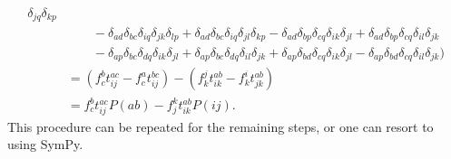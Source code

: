 \documentclass[
    a4paper, aps, twocolumn, floatfix, superscriptaddress,
    nofootinbib]{revtex4-1}
\newcommand{\1}{\mathds{1}}
\begin{document}
\begin{widetext}
\begin{align}
                        \delta_{j q} \delta_{k p}
                        \nonumber \\
                        &\qquad
                        - \delta_{a d} \delta_{b c} \delta_{i q}
                        \delta_{j k} \delta_{l p}
                        + \delta_{a d} \delta_{b c} \delta_{i q}
                        \delta_{j l} \delta_{k p}
                        - \delta_{a d} \delta_{b p} \delta_{c q}
                        \delta_{i k} \delta_{j l}
                        + \delta_{a d} \delta_{b p} \delta_{c q}
                        \delta_{i l} \delta_{j k}
                        \nonumber \\
                        &\qquad
                        - \delta_{a p} \delta_{b c} \delta_{d q}
                        \delta_{i k} \delta_{j l}
                        + \delta_{a p} \delta_{b c} \delta_{d q}
                        \delta_{i l} \delta_{j k}
                        + \delta_{a p} \delta_{b d} \delta_{c q}
                        \delta_{i k} \delta_{j l}
                        - \delta_{a p} \delta_{b d} \delta_{c q}
                        \delta_{i l} \delta_{j k}
                    \Big)
                    \nonumber \\
                    &= (f^b_c t^{ac}_{ij} - f^a_c t^{bc}_{ij})
                    - (f^j_k t^{ab}_{ik} - f^i_k t^{ab}_{jk})
                    \nonumber \\
                    &= f^b_c t^{ac}_{ij}P(ab) - f^k_j t^{ab}_{ik}P(ij).
            \end{align}
            This procedure can be repeated for the remaining steps, or one can
            resort to using SymPy.
        \end{widetext}
\end{document}
